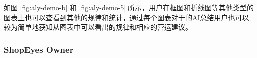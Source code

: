 如图 \ref{fig:aly-demo-b} 和 \ref{fig:aly-demo-5} 所示，用户在框图和折线图等其他类型的图表上也可以查看到其他的规律和统计，通过每个图表对于的AI总结用户也可以较为简单地获知从图表中可以看出的规律和相应的营运建议。

\subsubsection{ShopEyes Owner}

\begin{figure}[htbp]
    \centering
    \hfill
    \hfill

\end{figure}
